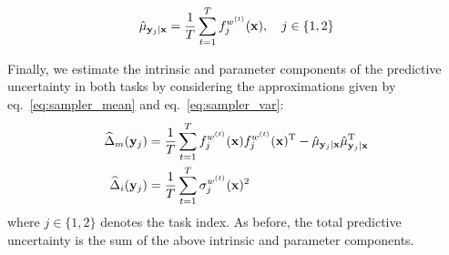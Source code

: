 \begin{equation*}
\hat{\mu}_{\mathbf{y}_j|\mathbf{x}} = \frac{1}{T}\sum_{t=1}^T f^{w^{(t)}}_{j}(\text{\textbf{x}}), \quad j \in \{1,2\}
 \end{equation*}

Finally, we estimate the intrinsic and parameter components of the predictive uncertainty in both tasks by considering the approximations given by eq.~\eqref{eq:sampler_mean} and eq.~\eqref{eq:sampler_var}: 
\begin{align}
\widehat{\Delta}_{m}(\mathbf{y}_j)  &=\frac{1}{T} \sum_{t=1}^{T} f^{w^{(t)}}_{j}(\text{\textbf{x}}) f^{w^{(t)}}_{j}(\text{\textbf{x}})^{\text{T}} -\hat{\mu}_{\mathbf{y}_j|\mathbf{x}} \hat{\mu}_{\mathbf{y}_j|\mathbf{x}}^{\text{T}}\\ 
\widehat{\Delta}_{i}(\mathbf{y}_j)  &= \frac{1}{T} \sum_{t=1}^T \sigma^{w^{(t)}}_{j}(\text{\textbf{x}})^{2}
\end{align}
where $ j \in \{1,2\}$ denotes the task index. As before, the total predictive uncertainty is the sum of the above intrinsic and parameter components. 


